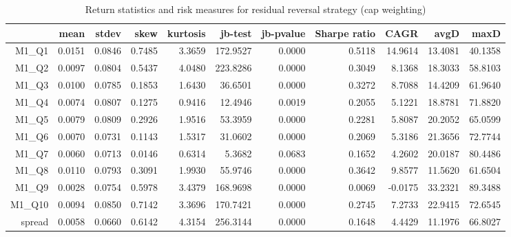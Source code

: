 \begin{table}[ht]
\centering
\begin{tabular}{rrrrrrrrrrr}
  \hline
 & mean & stdev & skew & kurtosis & jb-test & jb-pvalue & Sharpe ratio & CAGR & avgD & maxD \\ 
  \hline
M1\_Q1 & 0.0151 & 0.0846 & 0.7485 & 3.3659 & 172.9527 & 0.0000 & 0.5118 & 14.9614 & 13.4081 & 40.1358 \\ 
  M1\_Q2 & 0.0097 & 0.0804 & 0.5437 & 4.0480 & 223.8286 & 0.0000 & 0.3049 & 8.1368 & 18.3033 & 58.8103 \\ 
  M1\_Q3 & 0.0100 & 0.0785 & 0.1853 & 1.6430 & 36.6501 & 0.0000 & 0.3272 & 8.7088 & 14.4209 & 61.9640 \\ 
  M1\_Q4 & 0.0074 & 0.0807 & 0.1275 & 0.9416 & 12.4946 & 0.0019 & 0.2055 & 5.1221 & 18.8781 & 71.8820 \\ 
  M1\_Q5 & 0.0079 & 0.0809 & 0.2926 & 1.9516 & 53.3959 & 0.0000 & 0.2281 & 5.8087 & 20.2052 & 65.0599 \\ 
  M1\_Q6 & 0.0070 & 0.0731 & 0.1143 & 1.5317 & 31.0602 & 0.0000 & 0.2069 & 5.3186 & 21.3656 & 72.7744 \\ 
  M1\_Q7 & 0.0060 & 0.0713 & 0.0146 & 0.6314 & 5.3682 & 0.0683 & 0.1652 & 4.2602 & 20.0187 & 80.4486 \\ 
  M1\_Q8 & 0.0110 & 0.0793 & 0.3091 & 1.9930 & 55.9746 & 0.0000 & 0.3642 & 9.8577 & 11.5620 & 61.6504 \\ 
  M1\_Q9 & 0.0028 & 0.0754 & 0.5978 & 3.4379 & 168.9698 & 0.0000 & 0.0069 & -0.0175 & 33.2321 & 89.3488 \\ 
  M1\_Q10 & 0.0094 & 0.0850 & 0.7142 & 3.3696 & 170.7421 & 0.0000 & 0.2745 & 7.2733 & 22.9415 & 72.6545 \\ 
  spread & 0.0058 & 0.0660 & 0.6142 & 4.3154 & 256.3144 & 0.0000 & 0.1648 & 4.4429 & 11.1976 & 66.8027 \\ 
   \hline
\end{tabular}
\caption{Return statistics and risk measures for residual 
                             reversal strategy (cap weighting)} 
\label{tab:returnRevStats}
\end{table}
